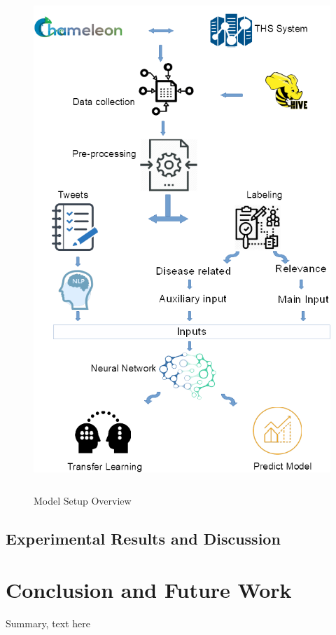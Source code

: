 \documentclass[12pt]{report}
\begin{document}
\begin{figure}[H]	
	\centering
	\includegraphics[height=190mm,  scale = 0.8]{images/10_architecture_setup.png}	
	\caption{Model Setup Overview}	
	\label{figure:model_setup}
\end{figure}

\section{Experimental Results and Discussion}

\chapter{Conclusion and Future Work} \label{chapter 6}
Summary, text here


 
\end{document}
